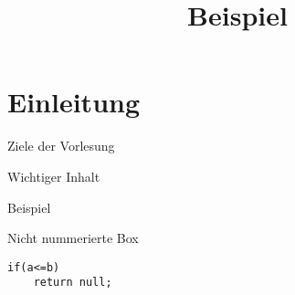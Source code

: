 \documentclass{cheatsheet}
\title{Beispiel}
\begin{document}
    \section{Einleitung}
    \begin{sectionbox}{Ziele der Vorlesung}
        \begin{warningbox}{Wichtiger Inhalt}
        \end{warningbox}
        \begin{hintbox}{Beispiel}
        \end{hintbox}
    \end{sectionbox}
    \begin{normbox}{Nicht nummerierte Box}
        \begin{verbatim}
if(a<=b)
    return null;
        \end{verbatim}
    \end{normbox}
\end{document}
